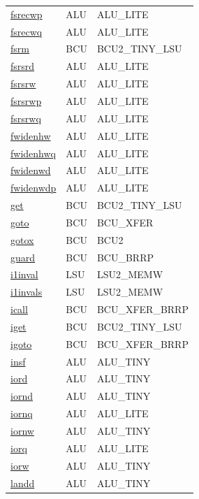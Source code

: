 \begin{small}
\begin{longtable}[l]{l l l}
\hyperlink{lvx.fsrecwp}{fsrecwp} & ALU & ALU\_LITE \\ 
\hyperlink{lvx.fsrecwq}{fsrecwq} & ALU & ALU\_LITE \\ 
\hyperlink{lvx.fsrm}{fsrm} & BCU & BCU2\_TINY\_LSU \\ 
\hyperlink{lvx.fsrsrd}{fsrsrd} & ALU & ALU\_LITE \\ 
\hyperlink{lvx.fsrsrw}{fsrsrw} & ALU & ALU\_LITE \\ 
\hyperlink{lvx.fsrsrwp}{fsrsrwp} & ALU & ALU\_LITE \\ 
\hyperlink{lvx.fsrsrwq}{fsrsrwq} & ALU & ALU\_LITE \\ 
\hyperlink{lvx.fwidenhw}{fwidenhw} & ALU & ALU\_LITE \\ 
\hyperlink{lvx.fwidenhwq}{fwidenhwq} & ALU & ALU\_LITE \\ 
\hyperlink{lvx.fwidenwd}{fwidenwd} & ALU & ALU\_LITE \\ 
\hyperlink{lvx.fwidenwdp}{fwidenwdp} & ALU & ALU\_LITE \\ 
\hyperlink{lvx.get}{get} & BCU & BCU2\_TINY\_LSU \\ 
\hyperlink{lvx.goto}{goto} & BCU & BCU\_XFER \\ 
\hyperlink{lvx.gotox}{gotox} & BCU & BCU2 \\ 
\hyperlink{lvx.guard}{guard} & BCU & BCU\_BRRP \\ 
\hyperlink{lvx.i1inval}{i1inval} & LSU & LSU2\_MEMW \\ 
\hyperlink{lvx.i1invals}{i1invals} & LSU & LSU2\_MEMW \\ 
\hyperlink{lvx.icall}{icall} & BCU & BCU\_XFER\_BRRP \\ 
\hyperlink{lvx.iget}{iget} & BCU & BCU2\_TINY\_LSU \\ 
\hyperlink{lvx.igoto}{igoto} & BCU & BCU\_XFER\_BRRP \\ 
\hyperlink{lvx.insf}{insf} & ALU & ALU\_TINY \\ 
\hyperlink{lvx.iord}{iord} & ALU & ALU\_TINY \\ 
\hyperlink{lvx.iornd}{iornd} & ALU & ALU\_TINY \\ 
\hyperlink{lvx.iornq}{iornq} & ALU & ALU\_LITE \\ 
\hyperlink{lvx.iornw}{iornw} & ALU & ALU\_TINY \\ 
\hyperlink{lvx.iorq}{iorq} & ALU & ALU\_LITE \\ 
\hyperlink{lvx.iorw}{iorw} & ALU & ALU\_TINY \\ 
\hyperlink{lvx.landd}{landd} & ALU & ALU\_TINY \\ 

\end{longtable}
\end{small}
